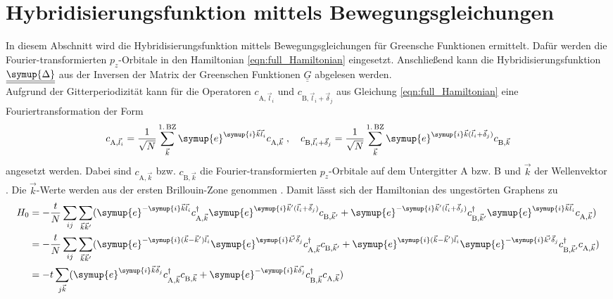 \section{Hybridisierungsfunktion mittels Bewegungsgleichungen}
\label{sec:calc_greensfunction}
In diesem Abschnitt wird die Hybridisierungsfunktion mittels Bewegungsgleichungen für Greensche Funktionen ermittelt. 
Dafür werden die Fourier-transformierten $p_z$-Orbitale in den Hamiltonian \eqref{eqn:full_Hamiltonian} eingesetzt.
Anschließend kann die Hybridisierungsfunktion $\underline{\underline{\symup{\Delta}}}$ aus der Inversen 
der Matrix der Greenschen Funktionen $\underline{\underline{G}}$ abgelesen werden.\\
Aufgrund der Gitterperiodizität kann für die Operatoren $c_{\text{A},\vec{l}_i}$ und $c_{\text{B},\vec{l}_i+\vec{\delta}_j}$ aus Gleichung \eqref{eqn:full_Hamiltonian} eine Fouriertransformation der Form 
\begin{equation}
    c_{\text{A},\vec{l}_i} = \frac{1}{\sqrt{N}} \sum_{\vec{k}}^{1. \, \text{BZ}} \symup{e}^{\symup{i}\vec{k}\vec{l}_i} c_{\text{A}, \vec{k}} \; , 
    \quad c_{\text{B},\vec{l}_i+\vec{\delta}_j} = \frac{1}{\sqrt{N}} \sum_{\vec{k}}^{1. \, \text{BZ}} \symup{e}^{\symup{i}\vec{k}(\vec{l}_i+\vec{\delta}_j)} c_{\text{B}, \vec{k}} \label{eqn:fourier_ladder}
\end{equation}
angesetzt werden.
Dabei sind $c_{\text{A}, \vec{k}}$ bzw. $c_{\text{B}, \vec{k}}$ die Fourier-transformierten $p_z$-Orbitale auf dem Untergitter A bzw. B 
und $\vec{k}$ der Wellenvektor \cite{anders-fkt}.
Die $\vec{k}$-Werte werden aus der ersten Brillouin-Zone genommen \cite{anders-fkt}.
Damit lässt sich der Hamiltonian des ungestörten Graphens zu 
\begin{equation}
    \begin{aligned}
    H_0 &= -\frac{t}{N} \sum_{ij} \sum_{\vec{k}\vec{k}'} ( \symup{e}^{-\symup{i}\vec{k}\vec{l}_i}c^\dagger_{\text{A},\vec{k}} 
    \symup{e}^{\symup{i}\vec{k}'(\vec{l}_i+\vec{\delta}_j)}c_{\text{B},\vec{k}'} + \symup{e}^{-\symup{i}\vec{k}'(\vec{l}_i+\vec{\delta}_j)} c^\dagger_{\text{B},\vec{k}'} 
    \symup{e}^{\symup{i}\vec{k}\vec{l}_i}c_{\text{A},\vec{k}}) \\
    &= -\frac{t}{N} \sum_{ij} \sum_{\vec{k}\vec{k}'} ( \symup{e}^{-\symup{i}(\vec{k}- \vec{k}')\vec{l}_i}\symup{e}^{\symup{i}\vec{k'}\vec{\delta}_j}c^\dagger_{\text{A},\vec{k}} c_{\text{B},\vec{k}'} + 
    \symup{e}^{\symup{i}(\vec{k}- \vec{k}')\vec{l}_i} \symup{e}^{-\symup{i}\vec{k'}\vec{\delta}_j} c^\dagger_{\text{B},\vec{k}'}c_{\text{A},\vec{k}}) \\
    &= -t \sum_{j\vec{k}} ( \symup{e}^{\symup{i}\vec{k}\vec{\delta}_j}c^\dagger_{\text{A},\vec{k}} c_{\text{B},\vec{k}} + 
    \symup{e}^{-\symup{i}\vec{k}\vec{\delta_j}} c^\dagger_{\text{B},\vec{k}}c_{\text{A},\vec{k}}) \label{eqn:H0fourier}
\end{aligned}
\end{equation}
